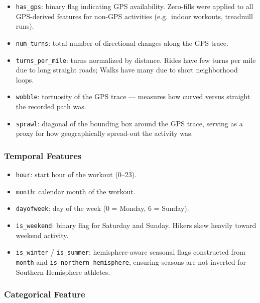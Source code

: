 \documentclass[11pt, onecolumn]{article}
\begin{document}
\begin{itemize}
    \item \texttt{has\_gps}: binary flag indicating GPS availability. Zero-fills were 
    applied to all GPS-derived features for non-GPS activities (e.g.\ indoor workouts, 
    treadmill runs).
    
    \item \texttt{num\_turns}: total number of directional changes along the GPS trace.
    
    \item \texttt{turns\_per\_mile}: turns normalized by distance. Rides have few turns 
    per mile due to long straight roads; Walks have many due to short neighborhood loops.
    
    \item \texttt{wobble}: tortuosity of the GPS trace --- measures how curved versus 
    straight the recorded path was.
    
    \item \texttt{sprawl}: diagonal of the bounding box around the GPS trace, serving 
    as a proxy for how geographically spread-out the activity was.
\end{itemize}

\subsubsection{Temporal Features}

\begin{itemize}
    \item \texttt{hour}: start hour of the workout (0--23).
    
    \item \texttt{month}: calendar month of the workout.
    
    \item \texttt{dayofweek}: day of the week (0 = Monday, 6 = Sunday).
    
    \item \texttt{is\_weekend}: binary flag for Saturday and Sunday. Hikers skew 
    heavily toward weekend activity.
    
    \item \texttt{is\_winter} / \texttt{is\_summer}: hemisphere-aware seasonal flags 
    constructed from \texttt{month} and \texttt{is\_northern\_hemisphere}, ensuring 
    seasons are not inverted for Southern Hemisphere athletes.
\end{itemize}

\subsubsection{Categorical Feature}
\end{document}
